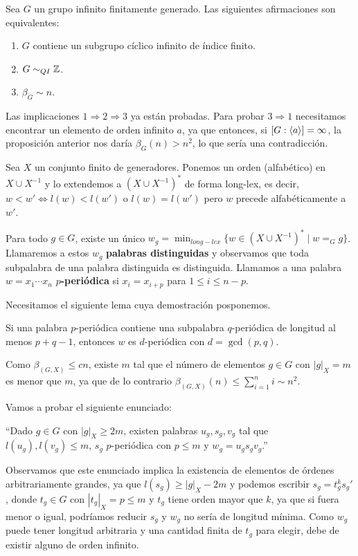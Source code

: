\documentclass[twoside, 11pt]{article}
\begin{document}
\begin{teorema}
Sea $G$ un grupo infinito finitamente generado. Las siguientes afirmaciones son equivalentes:
\begin{enumerate}
\item $G$ contiene un subgrupo cíclico infinito de índice finito.
\item $G\sim_{QI}\mathbb{Z}$.
\item $\beta_G\sim n$.
\end{enumerate}
\end{teorema}
\begin{dem}
Las implicaciones $1\Rightarrow 2\Rightarrow 3$ ya están probadas. Para probar $3\Rightarrow 1$ necesitamos encontrar un elemento de orden infinito $a$, ya que entonces, si $[G:\langle{a}\rangle]=\infty$, la proposición anterior nos daría $\beta_G(n)>n^2$, lo que sería una contradicción.

Sea $X$ un conjunto finito de generadores. Ponemos un orden (alfabético) en $X\cup X^{-1}$ y lo extendemos a $(X\cup X^{-1})^*$ de forma long-lex, es decir, $w<w'\Leftrightarrow l(w)<l(w')$ o $l(w)=l(w')$ pero $w$ precede alfabéticamente a $w'$. 

Para todo $g\in G$, existe un único $w_g=\min_{long-lex}\{w\in(X\cup X^{-1})^*\mid w=_G g\}$. Llamaremos a estos $w_g$ \textbf{palabras distinguidas} y observamos que toda subpalabra de una palabra distinguida es distinguida. Llamamos a una palabra $w=x_1\cdots x_n$ \textbf{$p$-periódica} si $x_i=x_{i+p}$ para $1\leq i\leq n-p$. 

Necesitamos el siguiente lema cuya demostración posponemos.

\begin{lemma}
Si una palabra $p$-periódica contiene una subpalabra $q$-periódica de longitud al menos $p+q-1$, entonces $w$ es $d$-periódica con $d=\gcd(p,q)$.
\end{lemma}

Como $\beta_{(G,X)}\leq cn$, existe $m$ tal que el número de elementos $g\in G$ con $|g|_X=m$ es menor que $m$, ya que de lo contrario $\beta_{(G,X)}(n)\leq \sum_{i=1}^n i\sim n^2$.

Vamos a probar el siguiente enunciado:

``Dado $g\in G$ con $|g|_X\geq 2m$, existen palabras $u_g, s_g,v_g$ tal que $l(u_g),l(v_g)\leq m$, $s_g$ $p$-periódica con $p\leq m$ y $w_g=u_gs_gv_g$.''

Observamos que este enunciado implica la existencia de elementos de órdenes arbitrariamente grandes, ya que $l(s_g)\geq |g|_X-2m$ y podemos escribir $s_g=t_g^ks_g'$, donde $t_g\in G$ con $|t_g|_X=p\leq m$ y $t_g$ tiene orden mayor que $k$, ya que si fuera menor o igual, podríamos reducir $s_g$ y $w_g$ no sería de longitud mínima. Como $w_g$ puede tener longitud arbitraria y una cantidad finita de $t_g$ para elegir, debe de existir alguno de orden infinito. 


\end{dem}
\end{document}
